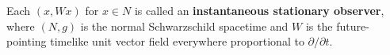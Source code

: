 Each $(x, Wx)$ for $x \in N$ is called an \textbf{instantaneous stationary observer}, where $(N, g)$ is the normal Schwarzschild spacetime and $W$ is the future-pointing timelike unit vector field everywhere proportional to $\partial/\partial t$.
